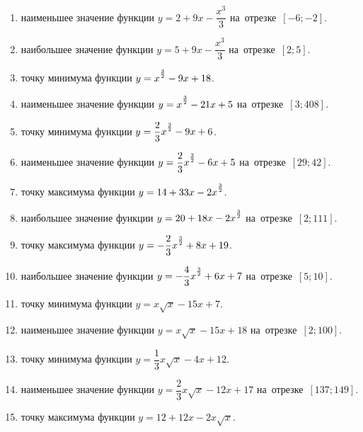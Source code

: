 \documentclass[a4paper,10pt]{article}
\begin{document}
\begin{enumerate}
\item {} наименьшее значение функции $y=2 +9x-\dfrac{x^3}{3}$ на~отрезке~$\left[-6;-2\right]$.

\item {} наибольшее значение функции $y=5 +9x-\dfrac{x^3}{3}$ на~отрезке~$\left[2;5\right]$.

\item {} точку минимума функции $y=x\strut^{\frac{3}{2}} -9x+18$.

\item {} наименьшее значение функции $y=x\strut^{\frac{3}{2}} -21x+5$ на~отрезке~$\left[3;408\right]$.

\item {} точку минимума функции $y=\dfrac{2}{3}x\strut^{\frac{3}{2}} -9x+6$.

\item {} наименьшее значение функции $y=\dfrac{2}{3}x\strut^{\frac{3}{2}} -6x+5$ на~отрезке~$\left[29;42\right]$.

\item {} точку максимума функции $y=14+33x-2x\strut^{\frac{3}{2}}$.

\item {} наибольшее значение функции $y=20+18x-2x\strut^{\frac{3}{2}}$ на~отрезке~$\left[2;111\right]$.

\item {} точку максимума функции $y=-\dfrac{2}{3}x\strut^{\frac{3}{2}} +8x+19$.

\item {} наибольшее значение функции $y=-\dfrac{4}{3}x\strut^{\frac{3}{2}} +6x+7$ на~отрезке~$\left[5;10\right]$.

\item {} точку минимума функции $y=x\sqrt{x} -15x+7$.

\item {} наименьшее значение функции $y=x\sqrt{x} -15x+18$ на~отрезке~$\left[2;100\right]$.

\item {} точку минимума функции $y=\dfrac{1}{3}x\sqrt{x} -4x+12$.

\item {} наименьшее значение функции $y=\dfrac{2}{3}x\sqrt{x} -12x+17$ на~отрезке~$\left[137;149\right]$.

\item {} точку максимума функции $y=12+12x -2x\sqrt{x}$.


\end{enumerate}
\end{document}
